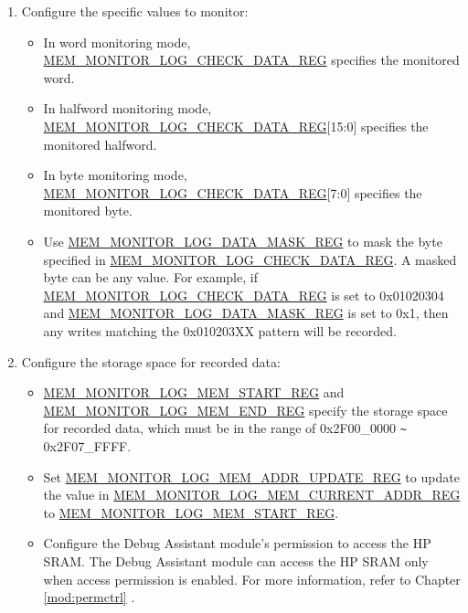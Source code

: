 \documentclass[main\_\_EN.tex]{subfiles}
\begin{document}
\begin{enumerate}
\begin{itemize}
        \end{itemize}
    \item Configure the specific values to monitor:
        \begin{itemize}
            \item In word monitoring mode, \hyperref[regdesc:MEMMONITORLOGCHECKDATAREG]{MEM\_MONITOR\_LOG\_CHECK\_DATA\_REG} specifies the monitored word.
            \item In halfword monitoring mode, \hyperref[regdesc:MEMMONITORLOGCHECKDATAREG]{MEM\_MONITOR\_LOG\_CHECK\_DATA\_REG}[15:0] specifies the monitored halfword.
            \item In byte monitoring mode, \hyperref[regdesc:MEMMONITORLOGCHECKDATAREG]{MEM\_MONITOR\_LOG\_CHECK\_DATA\_REG}[7:0] specifies the monitored byte.
            \item Use \hyperref[regdesc:MEMMONITORLOGDATAMASKREG]{MEM\_MONITOR\_LOG\_DATA\_MASK\_REG} to mask the byte specified in \hyperref[regdesc:MEMMONITORLOGCHECKDATAREG]{MEM\_MONITOR\_LOG\_CHECK\_DATA\_REG}. A masked byte can be any value. For example, if \hyperref[regdesc:MEMMONITORLOGCHECKDATAREG]{MEM\_MONITOR\_LOG\_CHECK\_DATA\_REG} is set to 0x01020304 and \hyperref[regdesc:MEMMONITORLOGDATAMASKREG]{MEM\_MONITOR\_LOG\_DATA\_MASK\_REG} is set to 0x1, then any writes matching the 0x010203XX pattern will be recorded.
        \end{itemize}
    \item Configure the storage space for recorded data:
        \begin{itemize}
            \item \hyperref[regdesc:MEMMONITORLOGMEMSTARTREG]{MEM\_MONITOR\_LOG\_MEM\_START\_REG} and \hyperref[regdesc:MEMMONITORLOGMEMENDREG]{MEM\_MONITOR\_LOG\_MEM\_END\_REG} specify the storage space for recorded data, which must be in the range of 0x2F00\_0000 \verb+~+ 0x2F07\_FFFF.
            \item Set \hyperref[regdesc:MEMMONITORLOGMEMADDRUPDATEREG]{MEM\_MONITOR\_LOG\_MEM\_ADDR\_UPDATE\_REG} to update the value in \hyperref[regdesc:MEMMONITORLOGMEMCURRENTADDRREG]{MEM\_MONITOR\_LOG\_MEM\_CURRENT\_ADDR\_REG} to \hyperref[regdesc:MEMMONITORLOGMEMSTARTREG]{MEM\_MONITOR\_LOG\_MEM\_START\_REG}.
            \item Configure the Debug Assistant module's permission to access the HP SRAM. The Debug Assistant module can access the HP SRAM only when access permission is enabled. For more information, refer to Chapter \ref{mod:permctrl} \textit{}.

\end{itemize}
\end{enumerate}
\end{document}
